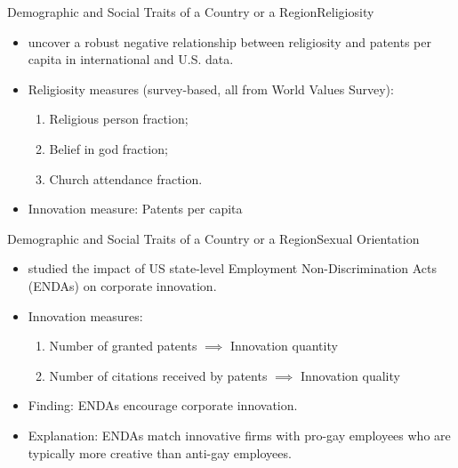 \documentclass{beamer}
\begin{document}
    \begin{frame}{Demographic and Social Traits of a Country or a Region}{Religiosity}
        \vspace{-1cm}
        \begin{itemize}
            \item \citet{BTV2022ForbiddenFruitsPolitical} uncover a robust negative relationship between religiosity and patents per capita in international and U.S. data.
            \item Religiosity measures (survey-based, all from World Values Survey):
            \begin{enumerate}
                \item Religious person fraction;
                \item Belief in god fraction;
                \item Church attendance fraction.
            \end{enumerate}
            \item Innovation measure: Patents per capita
        \end{itemize}

    \end{frame}

    \begin{frame}{Demographic and Social Traits of a Country or a Region}{Sexual Orientation}
        \vspace{-1cm}
        \begin{itemize}
            \item \citet{GZ2017EmploymentNondiscriminationActs} studied the impact of US state-level Employment Non-Discrimination Acts (ENDAs) on corporate innovation.
            \item Innovation measures: 
            \begin{enumerate}
                \item Number of granted patents $\implies$ Innovation quantity
                \item Number of citations received by patents $\implies$ Innovation quality
            \end{enumerate}
            \item Finding: ENDAs encourage corporate innovation.
            \item Explanation: ENDAs match innovative firms with pro-gay employees who are typically more creative than anti-gay employees.
        \end{itemize}
    \end{frame}
\end{document}
